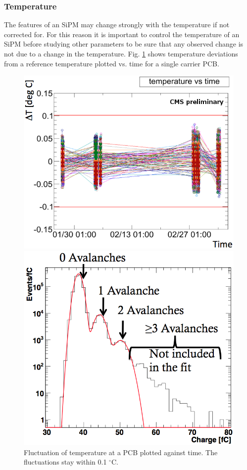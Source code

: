 \subsubsection{Temperature}
The features of an SiPM may change strongly with the temperature if not corrected for. For this reason it is important to control the temperature of an SiPM before studying other parameters to be sure that any observed change is not due to a change in the temperature. Fig. \ref{temperatureStability} shows  temperature deviations from a reference temperature plotted vs. time for a single carrier PCB.
\begin{figure}[h]
\centering
\begin{minipage}[t]{0.475\textwidth}
\includegraphics[width=\textwidth]{Figures/kuensken/temperature.png}
\caption{Fluctuation of temperature at a PCB plotted against time. The fluctuations stay within 0.1 $^\circ$C.}
\label{temperatureStability}
\end{minipage}
\hspace{0.5cm}
\begin{minipage}[t]{0.455\textwidth}
\includegraphics[width=\textwidth]{Figures/kuensken/gainDetermination.png}

\end{minipage}
\end{figure}
